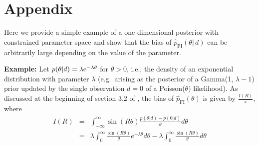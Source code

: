\documentclass[%
 reprint,
 amsmath,amssymb,
 aps,
]{revtex4-2}
\newcommand{\e}{{\rm e}}
\begin{document}
\appendix
\section{Appendix}
Here we provide a simple example of a one-dimensional posterior with constrained parameter space and show that the bias of $\hat{p}_\text{FI}(\theta|\,d)$ can be arbitrarily large depending on the value of the parameter.\bigskip

\noindent
{\bf Example:} Let $p(\theta|d)=\lambda \e^{-\lambda \theta}$ for $\theta>0$, i.e., the density of an exponential distribution with parameter $\lambda$ (e.g.\ arising as the posterior of a  Gamma(1, $\lambda-1$) prior updated by the single observation $d=0$ of a  Poisson($\theta$) likelihood). As discussed at the beginning of section 3.2 of \cite{rotiroti2022computing}, the bias of $\hat{p}_\text{FI}(\theta)$ is given by $\displaystyle \frac{I(R)}{\pi}$, where
\begin{eqnarray*} 
    I(R) & =& \int_{-\infty}^\infty \sin(R\theta) \frac{p(\theta|d) - p(0|d)}{\theta} d\theta \\
    & = &\lambda \int_0^\infty \frac{\sin(R\theta)}{\theta} e^{-\lambda \theta} d\theta - \lambda \int_0^\infty \frac{\sin(R\theta)}{\theta} d\theta
\end{eqnarray*}
\end{document}
